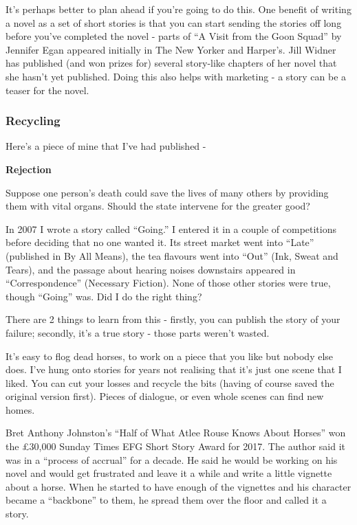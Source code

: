 \documentclass[11pt]{article}
\newenvironment{narrow}[2]{%
 \begin{list}{}{%
  \setlength{\topsep}{0pt}%
  \setlength{\leftmargin}{#1}%
  \setlength{\rightmargin}{#2}%
  \setlength{\listparindent}{\parindent}%
  \setlength{\itemindent}{\parindent}%
  \setlength{\parsep}{\parskip}%
 }%
\item[]}{\end{list}}
\begin{document}
It's perhaps better to plan ahead if you're going to do this. One benefit of
writing a novel as a set of short stories is that you can start sending the 
stories off long before you've completed the novel - parts of ``A Visit from the Goon Squad'' by Jennifer Egan appeared initially in The New Yorker and Harper's. Jill Widner has published (and won prizes for) several story-like chapters of her novel that she hasn't yet published. Doing this also helps with marketing - a story can be a teaser for the novel.



\subsubsection*{Recycling}
Here's a piece of mine that I've had published -
\begin{narrow}{1.0cm}{1.0cm}
\begin{center}\textbf{Rejection}\end{center}

Suppose one person’s death could save the lives of many others by providing them with vital organs. Should the state intervene for the greater good?

In 2007 I wrote a story called “Going.” I entered it in a couple of competitions before deciding that no one wanted it. Its street market went into “Late” (published in By All Means), the tea flavours went into “Out” (Ink, Sweat and Tears), and the passage about hearing noises downstairs appeared in “Correspondence” (Necessary Fiction). None of those other stories were true, though “Going” was. Did I do the right thing?
\end{narrow}
There are 2 things to learn from this - firstly, you can publish the story of your failure; secondly, it's a true story - those parts
weren't wasted.

It's easy to flog dead horses, to work on a piece that you like but nobody else does. I've hung onto stories for years not realising that it's just one scene that I liked. You can cut your losses and recycle the bits (having of course saved the original version first). Pieces of dialogue, or even whole scenes can find new homes. 

 Bret Anthony Johnston’s ``Half of What Atlee Rouse Knows About Horses'' won the £30,000 Sunday Times EFG Short Story Award for 2017. The author said it was in a “process of accrual” for a decade.  He said he would be working on his novel and would get frustrated and leave it a while and write a little vignette about a horse.  When he started to have enough of the vignettes and his character became a “backbone” to them, he spread them over the floor and called it a story.  
\end{document}
